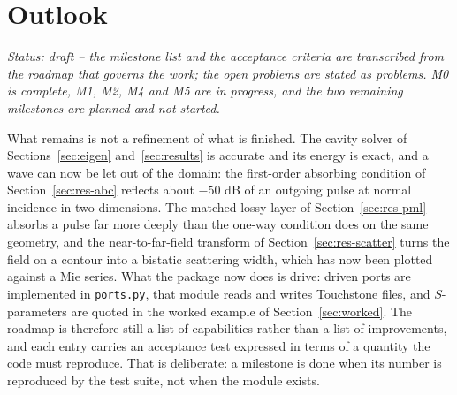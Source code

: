 \section{Outlook}
\label{sec:outlook}

\noindent\emph{Status: draft -- the milestone list and the acceptance criteria are transcribed from the roadmap
that governs the work; the open problems are stated as problems. M0 is complete, M1, M2, M4 and M5 are in
progress, and the two remaining milestones are planned and not started.}

What remains is not a refinement of what is finished. The cavity solver of Sections~\ref{sec:eigen}
and~\ref{sec:results} is accurate and its energy is exact, and a wave can now be let out of the domain: the
first-order absorbing condition of Section~\ref{sec:res-abc} reflects about $-50$ dB of an outgoing pulse at
normal incidence in two dimensions. The matched lossy layer of Section~\ref{sec:res-pml} absorbs a pulse far
more deeply than the one-way condition does on the same geometry, and the near-to-far-field transform of
Section~\ref{sec:res-scatter} turns the field on a contour into a bistatic scattering width, which has now
been plotted against a Mie series. What
the package now does is drive: driven ports are implemented in \texttt{ports.py}, that module reads and writes
Touchstone files, and $S$-parameters are quoted in the worked example of Section~\ref{sec:worked}.
The roadmap is therefore still a list of capabilities rather than a list of improvements, and each entry
carries an acceptance test expressed in terms of a quantity the code must reproduce. That is deliberate: a
milestone is done when its number is reproduced by the test suite, not when the module exists.

